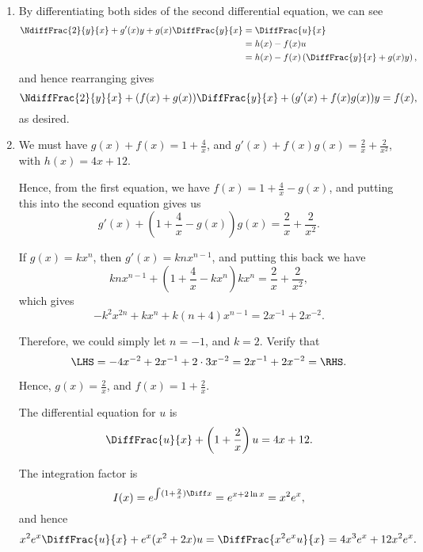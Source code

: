 \Question{\currfilebase}

\begin{enumerate}
    \item By differentiating both sides of the second differential equation, we can see
          \begin{align*}
              \NdiffFrac{2}{y}{x} + g'(x) y + g(x) \DiffFrac{y}{x} & = \DiffFrac{u}{x}                                    \\
                                                                   & = h(x) - f(x) u                                      \\
                                                                   & = h(x) - f(x) \left(\DiffFrac{y}{x} + g(x) y\right),
          \end{align*}
          and hence rearranging gives
          \[
              \NdiffFrac{2}{y}{x} + (f(x) + g(x)) \DiffFrac{y}{x} + (g'(x) + f(x) g(x))y = f(x),
          \]
          as desired.

    \item We must have \(g(x) + f(x) = 1 + \frac{4}{x}\), and \(g'(x) + f(x) g(x) = \frac{2}{x} + \frac{2}{x^2}\), with \(h(x) = 4x + 12\).

          Hence, from the first equation, we have \(f(x) = 1 + \frac{4}{x} - g(x)\), and putting this into the second equation gives us
          \[
              g'(x) + \left(1 + \frac{4}{x} - g(x)\right) g(x) = \frac{2}{x} + \frac{2}{x^2}.
          \]

          If \(g(x) = k x^n\), then \(g'(x) = kn x^{n - 1}\), and putting this back we have
          \[
              knx^{n - 1} + \left(1 + \frac{4}{x} - kx^n\right) kx^n = \frac{2}{x} + \frac{2}{x^2},
          \]
          which gives
          \[
              -k^2 x^{2n} + kx^n + k(n + 4)x^{n - 1} = 2x^{-1} + 2x^{-2}.
          \]

          Therefore, we could simply let \(n = -1\), and \(k = 2\). Verify that
          \[
              \LHS = -4 x^{-2} + 2x^{-1} + 2 \cdot 3 x^{-2} = 2 x^{-1} + 2 x^{-2} = \RHS.
          \]

          Hence, \(g(x) = \frac{2}{x}\), and \(f(x) = 1 + \frac{2}{x}\).

          The differential equation for \(u\) is
          \[
              \DiffFrac{u}{x} + \left(1 + \frac{2}{x}\right)u = 4x + 12.
          \]

          The integration factor is
          \[
              I(x) = e^{\int (1 + \frac{2}{x}) \Diff x} = e^{x + 2 \ln x} = x^2 e^x,
          \]
          and hence
          \[
              x^2 e^x \DiffFrac{u}{x} + e^x (x^2 + 2x)u = \DiffFrac{x^2 e^x u}{x} = 4x^3 e^x + 12 x^2 e^x.
          \]


\end{enumerate}
